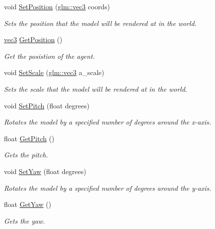 \begin{DoxyCompactItemize}
void \hyperlink{struct_agent_a0502dba36dde5b51033e38c744f2db11}{Set\+Position} (\hyperlink{_types_8h_a3d0ce73e3199de81565fb01632415288}{glm\+::vec3} coords)
\begin{DoxyCompactList}\small\item\em Sets the position that the model will be rendered at in the world. \end{DoxyCompactList}\item 
\hyperlink{_types_8h_a3d0ce73e3199de81565fb01632415288}{vec3} \hyperlink{struct_agent_a7f42342662f587ec076b7f283000331a}{Get\+Position} ()
\begin{DoxyCompactList}\small\item\em Get the posistion of the agent. \end{DoxyCompactList}\item 
void \hyperlink{struct_agent_afaba4f5661ada2bec70aee15e71852bd}{Set\+Scale} (\hyperlink{_types_8h_a3d0ce73e3199de81565fb01632415288}{glm\+::vec3} a\+\_\+scale)
\begin{DoxyCompactList}\small\item\em Sets the scale that the model will be rendered at in the world. \end{DoxyCompactList}\item 
void \hyperlink{struct_agent_a4ac318bdc2653ecbbbe95ab74602e207}{Set\+Pitch} (float degrees)
\begin{DoxyCompactList}\small\item\em Rotates the model by a specified number of degrees around the x-\/axis. \end{DoxyCompactList}\item 
float \hyperlink{struct_agent_a0ba5a593c61ffb2c199766478fe24af7}{Get\+Pitch} ()
\begin{DoxyCompactList}\small\item\em Gets the pitch. \end{DoxyCompactList}\item 
void \hyperlink{struct_agent_aa3295f1b269d653a36cb63aae7587576}{Set\+Yaw} (float degrees)
\begin{DoxyCompactList}\small\item\em Rotates the model by a specified number of degrees around the y-\/axis. \end{DoxyCompactList}\item 
float \hyperlink{struct_agent_ab8fd6738035a240f0a5cf77d9904b5f7}{Get\+Yaw} ()
\begin{DoxyCompactList}\small\item\em Gets the yaw. \end{DoxyCompactList}\item 

\end{DoxyCompactItemize}
